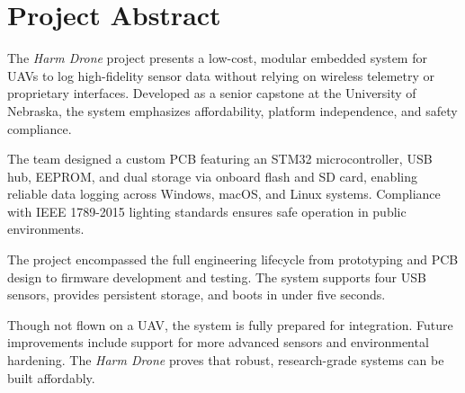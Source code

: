 \documentclass[../main.tex]{subfiles}
\begin{document}
\section*{Project Abstract}

\par The \textit{Harm Drone} project presents a low-cost, modular embedded system for UAVs to log high-fidelity sensor data without relying on wireless telemetry or proprietary interfaces. Developed as a senior capstone at the University of Nebraska, the system emphasizes affordability, platform independence, and safety compliance.

\par The team designed a custom PCB featuring an STM32 microcontroller, USB hub, EEPROM, and dual storage via onboard flash and SD card, enabling reliable data logging across Windows, macOS, and Linux systems. Compliance with IEEE 1789-2015 lighting standards ensures safe operation in public environments.

\par The project encompassed the full engineering lifecycle from prototyping and PCB design to firmware development and testing. The system supports four USB sensors, provides persistent storage, and boots in under five seconds.

\par Though not flown on a UAV, the system is fully prepared for integration. Future improvements include support for more advanced sensors and environmental hardening. The \textit{Harm Drone} proves that robust, research-grade systems can be built affordably.
\end{document}
